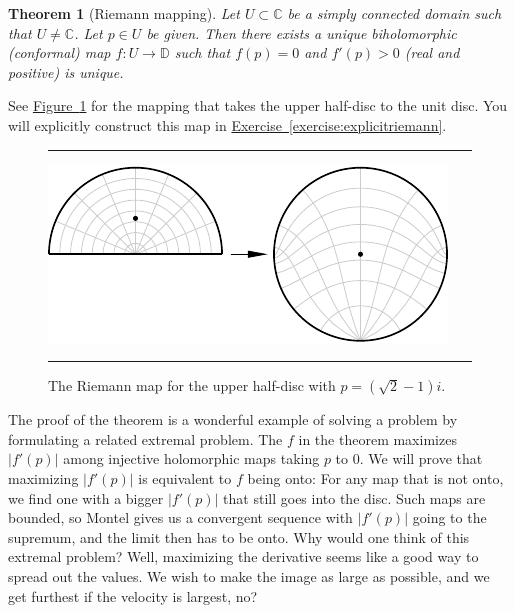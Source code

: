 \documentclass[12pt,openany]{book}
\newcommand{\sabs}[1]{\lvert {#1} \rvert}
\newcommand{\C}{{\mathbb{C}}}
\newcommand{\D}{{\mathbb{D}}}
\theoremstyle{plain}
\newtheorem{thm}{Theorem}[section]
\theoremstyle{remark}
\theoremstyle{definition}
\newenvironment{myfig}{%
\begin{figure}[h!t]
\noindent\rule{\textwidth}{0.5pt}\vspace{12pt}\par\centering}%
{\par\noindent\rule{\textwidth}{0.5pt}
\end{figure}}
\theoremstyle{exercise}
\theoremstyle{example}
\newcommand{\figureref}[1]{\hyperref[#1]{Figure~\ref*{#1}}}
\newcommand{\exerciseref}[1]{\hyperref[#1]{Exercise~\ref*{#1}}}
\begin{document}
\begin{thm}[Riemann mapping]\label{thm:RMT}
Let $U \subset \C$ be a simply connected domain such that $U \not= \C$.
Let $p \in U$ be given.  Then there exists a unique biholomorphic (conformal)
map $f \colon U \to \D$ such that $f(p) = 0$ and
$f'(p) > 0$ (real and positive) is unique.
\end{thm}

See \figureref{fig:riemannmap} for the mapping that takes the
upper half-disc to the unit disc.  You will explicitly construct this map in
\exerciseref{exercise:explicitriemann}.

\begin{myfig}
\includegraphics{figures/riemannmap}
\caption{The Riemann map for the upper half-disc with $p=(\sqrt{2}-1)i$.%
\label{fig:riemannmap}}
\end{myfig}

The proof of the theorem is a wonderful example of solving
a problem by formulating a related extremal problem.  The $f$
in the theorem maximizes
$\sabs{f'(p)}$ among injective holomorphic maps taking $p$ to 0.
We will prove that maximizing $\sabs{f'(p)}$ is equivalent to $f$ being
onto:
For any map that is not onto, we find one with a bigger
$\sabs{f'(p)}$ that still goes into the disc.  Such maps are bounded,
so Montel gives us a convergent sequence with $\sabs{f'(p)}$
going to the supremum, and the limit then has to be onto.
Why would one think of this extremal problem?  Well,
maximizing the derivative seems like a good way to spread out the values.
We wish to make the image as large as possible, and we get furthest if the
velocity is largest, no?
\end{document}
